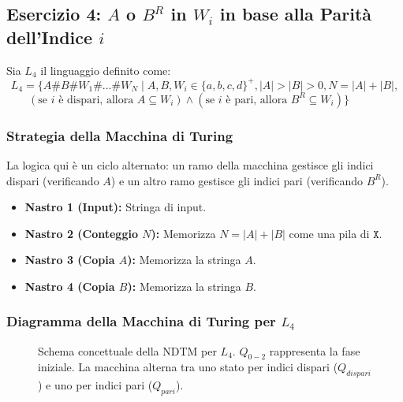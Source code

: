 \documentclass[a4paper]{article}
\theoremstyle{definition} %
\newcommand{\Sh}{\texttt{\#}} %
\newcommand{\X}{\texttt{X}} %
\begin{document}
\subsection{Esercizio 4: $A$ o $B^R$ in $W_i$ in base alla Parità dell'Indice $i$}

Sia $L_4$ il linguaggio definito come:
\[
L_4 = \{A\Sh B\Sh W_1 \Sh \dots \Sh W_N \mid A, B, W_i \in \{a,b,c,d\}^+, |A|>|B|>0, N=|A|+|B|, 
\]
$\qquad (\text{se } i \text{ è dispari, allora } A \subseteq W_i) \land (\text{se } i \text{ è pari, allora } B^R \subseteq W_i) \}$

\subsubsection{Strategia della Macchina di Turing}
La logica qui è un ciclo alternato: un ramo della macchina gestisce gli indici dispari (verificando $A$) e un altro ramo gestisce gli indici pari (verificando $B^R$).
\begin{itemize}
    \item \textbf{Nastro 1 (Input):} Stringa di input.
    \item \textbf{Nastro 2 (Conteggio $N$):} Memorizza $N = |A| + |B|$ come una pila di $\X$.
    \item \textbf{Nastro 3 (Copia $A$):} Memorizza la stringa $A$.
    \item \textbf{Nastro 4 (Copia $B$):} Memorizza la stringa $B$.
\end{itemize}

\subsubsection{Diagramma della Macchina di Turing per $L_4$}
\begin{figure}[h!]
\centering
{}
\caption{Schema concettuale della NDTM per $L_4$. $Q_{0-2}$ rappresenta la fase iniziale. La macchina alterna tra uno stato per indici dispari ($Q_{dispari}$) e uno per indici pari ($Q_{pari}$).}
\end{figure}
\end{document}
